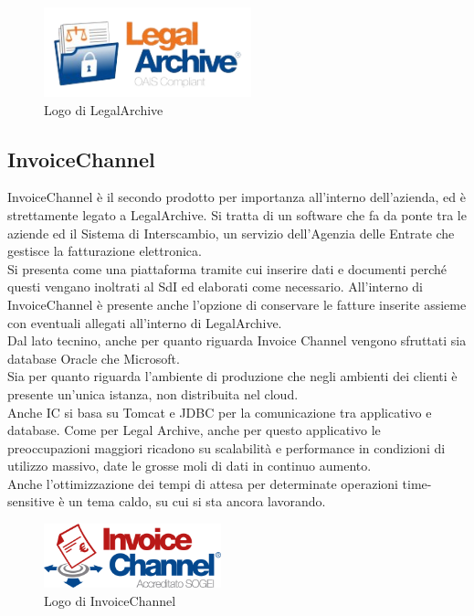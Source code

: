 \begin{figure}[htbp]
\begin{center}
\includegraphics[height=7em]{immagini/tecnologies-logos/logo-legal-archive.png}
\caption{Logo di LegalArchive}
\end{center}
\end{figure}

\subsection{InvoiceChannel}
InvoiceChannel è il secondo prodotto per importanza all'interno dell'azienda, ed è strettamente legato a LegalArchive.
Si tratta di un software che fa da ponte tra le aziende ed il Sistema di Interscambio, un servizio dell'Agenzia delle Entrate che gestisce la fatturazione elettronica.\\
Si presenta come una piattaforma tramite cui inserire dati e documenti perché questi vengano inoltrati al SdI ed elaborati come necessario. All'interno di InvoiceChannel è presente anche l'opzione di conservare le fatture inserite assieme con eventuali allegati all'interno di LegalArchive.\\
Dal lato tecnino, anche per quanto riguarda Invoice Channel vengono sfruttati sia database Oracle che Microsoft.\\
Sia per quanto riguarda l'ambiente di produzione che negli ambienti dei clienti è presente un'unica istanza, non distribuita nel cloud.\\
Anche IC si basa su Tomcat e JDBC per la comunicazione tra applicativo e database.
Come per Legal Archive, anche per questo applicativo le preoccupazioni maggiori ricadono su scalabilità e performance in condizioni di utilizzo massivo, date le grosse moli di dati in continuo aumento.\\
Anche l'ottimizzazione dei tempi di attesa per determinate operazioni time-sensitive è un tema caldo, su cui si sta ancora lavorando.\\

\begin{figure}[htbp]
\begin{center}
\includegraphics[height=5em]{immagini/tecnologies-logos/logo-invoice-channel.png}
\caption{Logo di InvoiceChannel}
\end{center}
\end{figure}

